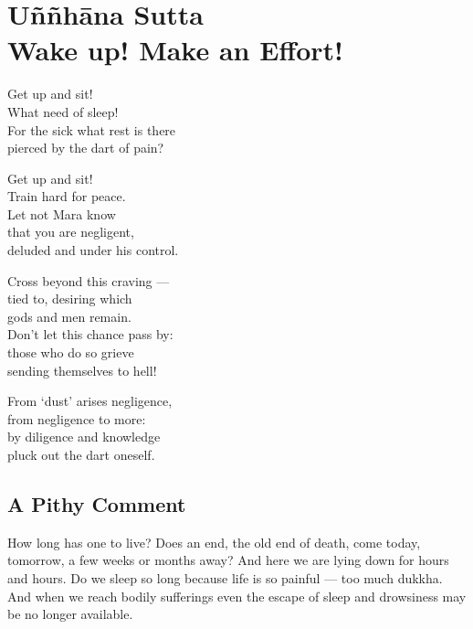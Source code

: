 \begin{MyDescription}[(Sn.324-330)]{}
\end{MyDescription}   

\chapter{U\~n\~nh\=ana Sutta \\ Wake up! Make an Effort!}

\begin{MyDescription}{}
Get up and sit!\\
What need of sleep!\\
For the sick what rest is there\\
pierced by the dart of pain?
\end{MyDescription}


\begin{MyDescription}{}
Get up and sit!\\
Train hard for peace.\\
Let not Mara know\\
that you are negligent,\\
deluded and under his control.
\end{MyDescription}

\begin{MyDescription}{}
Cross beyond this craving —\\
tied to, desiring which\\
gods and men remain.\\
Don't let this chance pass by:\\
those who do so grieve\\
sending themselves to hell!
\end{MyDescription}

\begin{MyDescription}{}
From `dust' arises negligence,\\
from negligence to more:\\
by diligence and knowledge\\
pluck out the dart oneself.
\end{MyDescription}

\begin{MyDescription}[(Sn. 331-334)]{}
\end{MyDescription}
\newpage
\section{A Pithy Comment}
How long has one to live? Does an end, the old end of death, come today, tomorrow, a few weeks or months away? And here we are lying down for hours and hours. Do we sleep so long because life is so painful — too much dukkha. And when we reach bodily sufferings even the escape of sleep and drowsiness may be no longer available.\\

